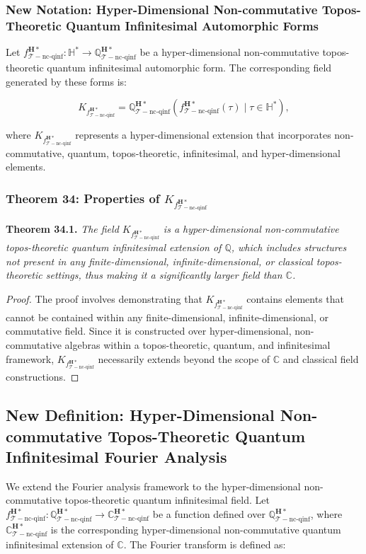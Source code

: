 \documentclass{article}
\begin{document}
\subsubsection{New Notation: Hyper-Dimensional Non-commutative Topos-Theoretic Quantum Infinitesimal Automorphic Forms}
Let \(f_{\mathcal{T}-\text{nc-qinf}}^{\mathbf{H}*}: \mathbb{H}^* \to \mathbb{Q}_{\mathcal{T}-\text{nc-qinf}}^{\mathbf{H}*}\) be a hyper-dimensional non-commutative topos-theoretic quantum infinitesimal automorphic form. The corresponding field generated by these forms is:

\[
K_{f_{\mathcal{T}-\text{nc-qinf}}^{\mathbf{H}*}} = \mathbb{Q}_{\mathcal{T}-\text{nc-qinf}}^{\mathbf{H}*}(f_{\mathcal{T}-\text{nc-qinf}}^{\mathbf{H}*}(\tau) \mid \tau \in \mathbb{H}^*),
\]

where \(K_{f_{\mathcal{T}-\text{nc-qinf}}^{\mathbf{H}*}}\) represents a hyper-dimensional extension that incorporates non-commutative, quantum, topos-theoretic, infinitesimal, and hyper-dimensional elements.

\subsubsection{Theorem 34: Properties of \(K_{f_{\mathcal{T}-\text{nc-qinf}}^{\mathbf{H}*}}\)}
\textbf{Theorem 34.1.} \textit{The field \(K_{f_{\mathcal{T}-\text{nc-qinf}}^{\mathbf{H}*}}\) is a hyper-dimensional non-commutative topos-theoretic quantum infinitesimal extension of \(\mathbb{Q}\), which includes structures not present in any finite-dimensional, infinite-dimensional, or classical topos-theoretic settings, thus making it a significantly larger field than \(\mathbb{C}\).}

\begin{proof}
The proof involves demonstrating that \(K_{f_{\mathcal{T}-\text{nc-qinf}}^{\mathbf{H}*}}\) contains elements that cannot be contained within any finite-dimensional, infinite-dimensional, or commutative field. Since it is constructed over hyper-dimensional, non-commutative algebras within a topos-theoretic, quantum, and infinitesimal framework, \(K_{f_{\mathcal{T}-\text{nc-qinf}}^{\mathbf{H}*}}\) necessarily extends beyond the scope of \(\mathbb{C}\) and classical field constructions.
\end{proof}

\subsection{New Definition: Hyper-Dimensional Non-commutative Topos-Theoretic Quantum Infinitesimal Fourier Analysis}
We extend the Fourier analysis framework to the hyper-dimensional non-commutative topos-theoretic quantum infinitesimal field. Let \(f_{\mathcal{T}-\text{nc-qinf}}^{\mathbf{H}*}: \mathbb{Q}_{\mathcal{T}-\text{nc-qinf}}^{\mathbf{H}*} \to \mathbb{C}_{\mathcal{T}-\text{nc-qinf}}^{\mathbf{H}*}\) be a function defined over \(\mathbb{Q}_{\mathcal{T}-\text{nc-qinf}}^{\mathbf{H}*}\), where \(\mathbb{C}_{\mathcal{T}-\text{nc-qinf}}^{\mathbf{H}*}\) is the corresponding hyper-dimensional non-commutative quantum infinitesimal extension of \(\mathbb{C}\). The Fourier transform is defined as:
\end{document}
